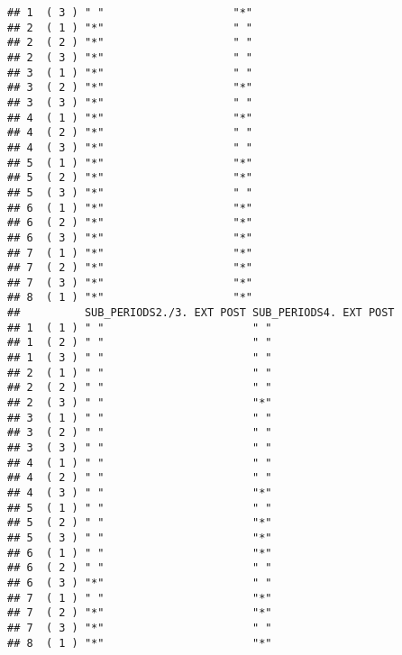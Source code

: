 \documentclass[
]{book}
\begin{document}
\begin{verbatim}
## 1  ( 3 ) " "                    "*"                    
## 2  ( 1 ) "*"                    " "                    
## 2  ( 2 ) "*"                    " "                    
## 2  ( 3 ) "*"                    " "                    
## 3  ( 1 ) "*"                    " "                    
## 3  ( 2 ) "*"                    "*"                    
## 3  ( 3 ) "*"                    " "                    
## 4  ( 1 ) "*"                    "*"                    
## 4  ( 2 ) "*"                    " "                    
## 4  ( 3 ) "*"                    " "                    
## 5  ( 1 ) "*"                    "*"                    
## 5  ( 2 ) "*"                    "*"                    
## 5  ( 3 ) "*"                    " "                    
## 6  ( 1 ) "*"                    "*"                    
## 6  ( 2 ) "*"                    "*"                    
## 6  ( 3 ) "*"                    "*"                    
## 7  ( 1 ) "*"                    "*"                    
## 7  ( 2 ) "*"                    "*"                    
## 7  ( 3 ) "*"                    "*"                    
## 8  ( 1 ) "*"                    "*"                    
##          SUB_PERIODS2./3. EXT POST SUB_PERIODS4. EXT POST
## 1  ( 1 ) " "                       " "                   
## 1  ( 2 ) " "                       " "                   
## 1  ( 3 ) " "                       " "                   
## 2  ( 1 ) " "                       " "                   
## 2  ( 2 ) " "                       " "                   
## 2  ( 3 ) " "                       "*"                   
## 3  ( 1 ) " "                       " "                   
## 3  ( 2 ) " "                       " "                   
## 3  ( 3 ) " "                       " "                   
## 4  ( 1 ) " "                       " "                   
## 4  ( 2 ) " "                       " "                   
## 4  ( 3 ) " "                       "*"                   
## 5  ( 1 ) " "                       " "                   
## 5  ( 2 ) " "                       "*"                   
## 5  ( 3 ) " "                       "*"                   
## 6  ( 1 ) " "                       "*"                   
## 6  ( 2 ) " "                       " "                   
## 6  ( 3 ) "*"                       " "                   
## 7  ( 1 ) " "                       "*"                   
## 7  ( 2 ) "*"                       "*"                   
## 7  ( 3 ) "*"                       " "                   
## 8  ( 1 ) "*"                       "*"
\end{verbatim}
\end{document}
